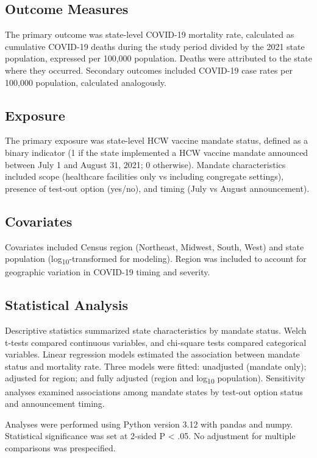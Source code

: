 \documentclass[10pt, letterpaper]{article}
\begin{document}
\subsection*{Outcome Measures}
The primary outcome was state-level COVID-19 mortality rate, calculated as cumulative COVID-19 deaths during the study period divided by the 2021 state population, expressed per 100,000 population. Deaths were attributed to the state where they occurred. Secondary outcomes included COVID-19 case rates per 100,000 population, calculated analogously.

\subsection*{Exposure}
The primary exposure was state-level HCW vaccine mandate status, defined as a binary indicator (1 if the state implemented a HCW vaccine mandate announced between July 1 and August 31, 2021; 0 otherwise). Mandate characteristics included scope (healthcare facilities only vs including congregate settings), presence of test-out option (yes/no), and timing (July vs August announcement).

\subsection*{Covariates}
Covariates included Census region (Northeast, Midwest, South, West) and state population (log\textsubscript{10}-transformed for modeling). Region was included to account for geographic variation in COVID-19 timing and severity.

\subsection*{Statistical Analysis}
Descriptive statistics summarized state characteristics by mandate status. Welch t-tests compared continuous variables, and chi-square tests compared categorical variables. Linear regression models estimated the association between mandate status and mortality rate. Three models were fitted: unadjusted (mandate only); adjusted for region; and fully adjusted (region and log\textsubscript{10} population). Sensitivity analyses examined associations among mandate states by test-out option status and announcement timing.

Analyses were performed using Python version 3.12 with pandas and numpy. Statistical significance was set at 2-sided P < .05. No adjustment for multiple comparisons was prespecified.
\end{document}
